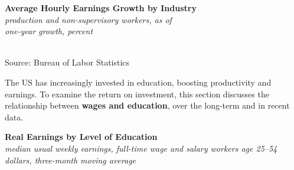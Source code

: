 \documentclass{report}
\newcommand{\tbllink}[1]{\href{https://raw.githubusercontent.com/bdecon/US-chartbook/master/chartbook/data/#1}{\faTable}}
\newcommand{\barylab}[2]{yticklabel style={text width=#1, align=right, 
		style={black!70}, text height=#2},}
\newcommand{\barplotnogrid}{xbar=0pt, axis line style={draw=none},
	    yticklabel style={align=left, anchor=east},
      		xmajorticks=false, ymajorgrids=false,   
	    ytick=data, tickwidth=0pt, area legend, reverse legend,
	    nodes near coords align={horizontal},}
\begin{document}
{{\begin{minipage}{0.76\textwidth}
\normalsize \textbf{Average Hourly Earnings Growth by Industry}\\
\footnotesize{\textit{production and non-supervisory workers, as of }}\\
\footnotesize{\textit{one-year growth, percent}}\\
\hspace*{-2mm} \\ 
\footnotesize{Source: Bureau of Labor Statistics} \hspace{48mm} \tbllink{ahe_ind.csv}
\end{minipage}
\newpage
\begin{minipage}{0.76\textwidth}
\small The US has increasingly invested in education, boosting productivity and earnings. To examine the return on investment, this section discusses the relationship between \textbf{wages and education}, over the long-term and in recent data. 


\vspace{1mm}

\normalsize \textbf{Real Earnings by Level of Education}\\
\footnotesize{\textit{median usual weekly earnings, full-time wage and salary workers age 25--54}}\\
\footnotesize{\textit{dollars, three-month moving average}}
\vspace{4.4cm}


\end{minipage}}}
\end{document}

